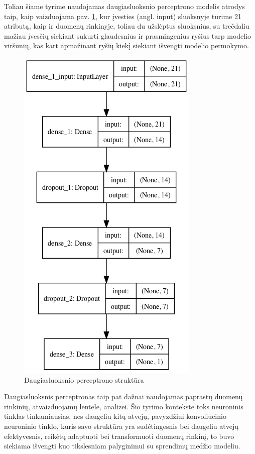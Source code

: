 \documentclass{VUMIFPSbakalaurinis}
\begin{document}
Toliau šiame tyrime naudojamas daugiasluoksnio perceptrono modelis atrodys taip, kaip vaizduojama pav. \ref{img:model}, kur įvesties (angl. input) sluoksnyje turime 21 atributą, kaip ir duomenų rinkinyje, toliau du užslėptus sluoksnius, su trečdaliu mažiau įvesčių siekiant sukurti glaudesnius ir prasmingenius ryšius tarp modelio viršūnių, kas kart apmažinant ryšių kiekį siekiant išvengti modelio permokymo.

\begin{figure}[H]
    \centering
    \includegraphics[scale=0.5]{img/model}
    \caption{Daugiasluoksnio perceptrono struktūra}
    \label{img:model}
\end{figure}

Daugiasluoksnis perceptronas taip pat dažnai naudojamas paprastų duomenų rinkinių, atvaizduojamų lentele, analizei. Šio tyrimo kontekste toks neuroninis tinklas tinkamiausias, nes daugeliu kitų atvejų, pavyzdžiui konvoliucinio neuroninio tinklo, kuris savo struktūra yra sudėtingesnis bei daugeliu atvejų efektyvesnis, reikėtų adaptuoti bei transformuoti duomenų rinkinį, to buvo siekiama išvengti kuo tikslesniam palyginimui su sprendimų medžio modeliu.
\end{document}
